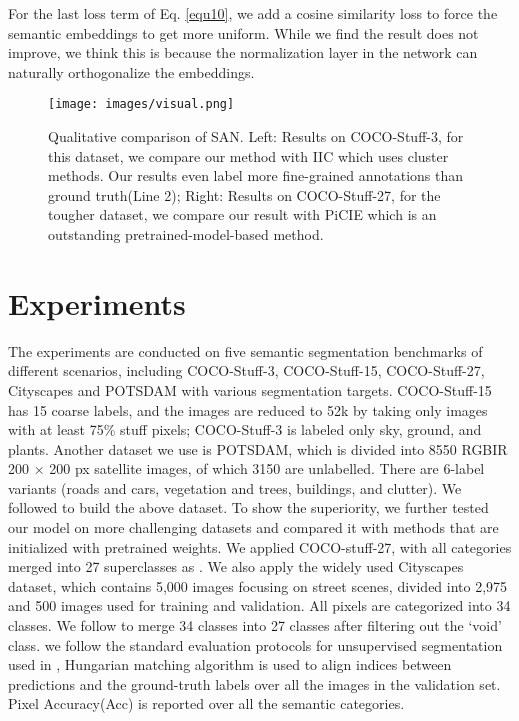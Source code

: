 \documentclass[letterpaper]{article} \usepackage{aaai23}  \usepackage{times}  \usepackage{helvet}  \usepackage{courier}  \usepackage[hyphens]{url}  \usepackage{graphicx} \urlstyle{rm} \def\UrlFont{\rm}  \usepackage{natbib}  \usepackage{caption} \frenchspacing  \setlength{\pdfpagewidth}{8.5in}  \setlength{\pdfpageheight}{11in}  \usepackage{algorithm}
\begin{document}
For the last loss term of Eq. \ref{equ10}, we add a cosine similarity loss to force the semantic embeddings to get more uniform. While we find the result does not improve, we think this is because the normalization layer in the network can naturally orthogonalize the embeddings.


\begin{figure*}[t]
\centering
\texttt{[image: images/visual.png]} \caption{{ Qualitative comparison of SAN.} { Left: Results on COCO-Stuff-3}, for this dataset, we compare our method with IIC\cite{ji2019invariant} which uses cluster methods. Our results even label more fine-grained annotations than ground truth(Line 2); { Right: Results on COCO-Stuff-27}, for the tougher dataset, we compare our result with PiCIE\cite{cho2021picie} which is an outstanding pretrained-model-based method.}
\label{result}
\end{figure*}

\section{Experiments}

The experiments are conducted on five semantic segmentation benchmarks of different scenarios, including COCO-Stuff-3\cite{caesar2018coco}, COCO-Stuff-15, COCO-Stuff-27, Cityscapes\cite{Cordts2016Cityscapes} and POTSDAM\cite{rottensteiner2014isprs} with various segmentation targets. COCO-Stuff-15 has 15 coarse labels, and the images are reduced to 52k by taking only images with at least 75\% stuff pixels; COCO-Stuff-3 is labeled only sky, ground, and plants. Another dataset we use is POTSDAM, which is divided into 8550 RGBIR 200 × 200 px satellite images, of which 3150 are unlabelled. There are 6-label variants (roads and cars, vegetation and trees, buildings, and clutter). We followed \cite{ji2019invariant} to build the above dataset. To show the superiority, we further tested our model on more challenging datasets and compared it with methods that are initialized with pretrained weights. We applied COCO-stuff-27, with all categories merged into 27 superclasses as \cite{cho2021picie}. We also apply the widely used Cityscapes dataset, which contains 5,000 images focusing on street scenes, divided into 2,975 and 500 images used for training and validation. All pixels are categorized into 34 classes. We follow \cite{cho2021picie} to merge 34 classes into 27 classes after filtering out the ‘void’ class. we follow the standard evaluation protocols for unsupervised segmentation used in \cite{cho2021picie}\cite{ji2019invariant}, Hungarian matching algorithm\cite{kuhn1955hungarian} is used to align indices between predictions and the ground-truth labels over all the images in the validation set. Pixel Accuracy(Acc) is reported over all the semantic categories.
\end{document}
